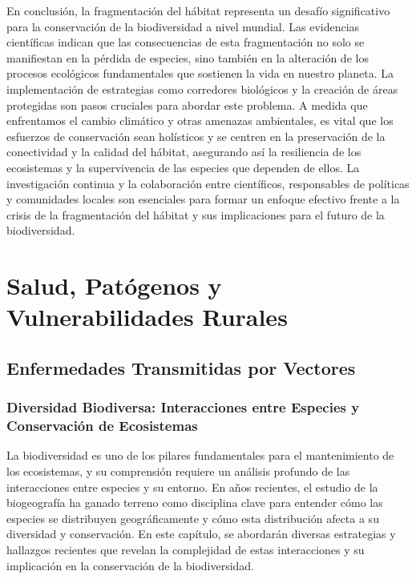\documentclass[
  letterpaper,
  DIV=11,
  numbers=noendperiod,
  oneside]{scrreprt}
\begin{document}
En conclusión, la fragmentación del hábitat representa un desafío
significativo para la conservación de la biodiversidad a nivel mundial.
Las evidencias científicas indican que las consecuencias de esta
fragmentación no solo se manifiestan en la pérdida de especies, sino
también en la alteración de los procesos ecológicos fundamentales que
sostienen la vida en nuestro planeta. La implementación de estrategias
como corredores biológicos y la creación de áreas protegidas son pasos
cruciales para abordar este problema. A medida que enfrentamos el cambio
climático y otras amenazas ambientales, es vital que los esfuerzos de
conservación sean holísticos y se centren en la preservación de la
conectividad y la calidad del hábitat, asegurando así la resiliencia de
los ecosistemas y la supervivencia de las especies que dependen de
ellos. La investigación continua y la colaboración entre científicos,
responsables de políticas y comunidades locales son esenciales para
formar un enfoque efectivo frente a la crisis de la fragmentación del
hábitat y sus implicaciones para el futuro de la biodiversidad.

\part{Salud, Patógenos y Vulnerabilidades Rurales}

\chapter{Enfermedades Transmitidas por
Vectores}\label{enfermedades-transmitidas-por-vectores}

\section{Diversidad Biodiversa: Interacciones entre Especies y
Conservación de
Ecosistemas}\label{diversidad-biodiversa-interacciones-entre-especies-y-conservaciuxf3n-de-ecosistemas}

La biodiversidad es uno de los pilares fundamentales para el
mantenimiento de los ecosistemas, y su comprensión requiere un análisis
profundo de las interacciones entre especies y su entorno. En años
recientes, el estudio de la biogeografía ha ganado terreno como
disciplina clave para entender cómo las especies se distribuyen
geográficamente y cómo esta distribución afecta a su diversidad y
conservación. En este capítulo, se abordarán diversas estrategias y
hallazgos recientes que revelan la complejidad de estas interacciones y
su implicación en la conservación de la biodiversidad.
\end{document}
